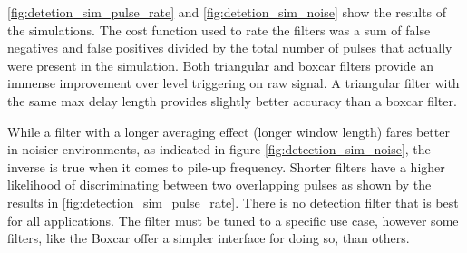 \autoref{fig:detetion_sim_pulse_rate} and \autoref{fig:detetion_sim_noise}
show the results of the simulations. The cost function used to rate the 
filters was a sum of false negatives and false positives divided by the 
total number of pulses that actually were present in the simulation.
Both triangular and boxcar filters provide an immense improvement over
level triggering on raw signal. A triangular filter
with the same max delay length provides slightly better accuracy 
than a boxcar filter.


While a filter with a longer averaging effect (longer window length) 
fares better in noisier environments, as indicated in figure
\autoref{fig:detection_sim_noise}, the inverse is true when 
it comes to pile-up frequency. Shorter filters have a higher likelihood
of discriminating between two overlapping pulses as shown 
by the results in \autoref{fig:detection_sim_pulse_rate}.
There is no detection filter that is best for all applications.
The filter must be tuned to a specific use case, however
some filters, like the Boxcar offer a simpler interface for
doing so, than others.

